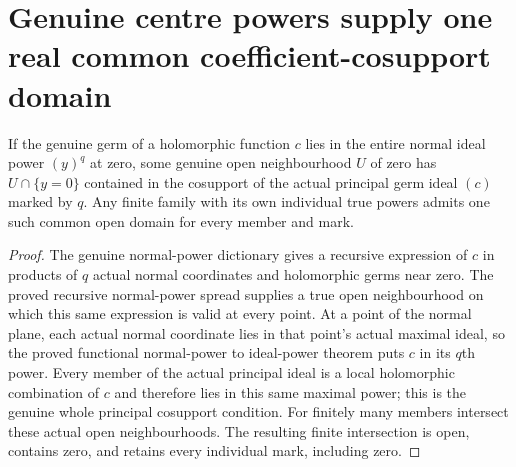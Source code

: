 \section{Genuine centre powers supply one real common coefficient-cosupport domain}
\label{sec:hironaka-actual-coefficient-cosupport-spread}

\begin{theorem}
\label{hir:actual-coefficient-normal-power-cosupport-open}
\leanok
If the genuine germ of a holomorphic function $c$ lies in the entire normal ideal power $(y)^q$ at zero, some genuine open neighbourhood $U$ of zero has $U\cap\{y=0\}$ contained in the cosupport of the actual principal germ ideal $(c)$ marked by $q$.
Any finite family with its own individual true powers admits one such common open domain for every member and mark.
\end{theorem}
\begin{proof}
The genuine normal-power dictionary gives a recursive expression of $c$ in products of $q$ actual normal coordinates and holomorphic germs near zero. The proved recursive normal-power spread supplies a true open neighbourhood on which this same expression is valid at every point. At a point of the normal plane, each actual normal coordinate lies in that point's actual maximal ideal, so the proved functional normal-power to ideal-power theorem puts $c$ in its $q$th power. Every member of the actual principal ideal is a local holomorphic combination of $c$ and therefore lies in this same maximal power; this is the genuine whole principal cosupport condition. For finitely many members intersect these actual open neighbourhoods. The resulting finite intersection is open, contains zero, and retains every individual mark, including zero.
\end{proof}

